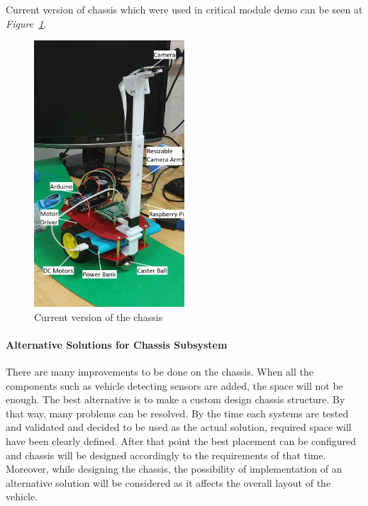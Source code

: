 \documentclass[a4paper,12pt]{article}
\begin{document}
	Current version of chassis which were used in critical module demo can be seen at \textit{Figure~\ref{fig:chassis}}.
	 
	\begin{figure}[h]
		\center
		\setlength{\unitlength}{\textwidth} 								 
		\includegraphics[width=0.5\textwidth]{images/chassis3}
		\caption{\label{fig:chassis}Current version of the chassis }
	\end{figure}
	
	\paragraph{Alternative Solutions for Chassis Subsystem}
	There are many improvements to be done on the chassis. When all the components such as vehicle detecting sensors are added, the space will not be enough. The best alternative is to make a custom design chassis structure. By that way, many problems can be resolved. By the time each systems are tested and validated and decided to be used as the actual solution, required space will have been clearly defined. After that point the best placement can be configured and chassis will be designed accordingly to the requirements of that time. Moreover, while designing the chassis, the possibility of implementation of an alternative solution will be considered as it affects the overall layout of the vehicle.\\
	
\end{document}
